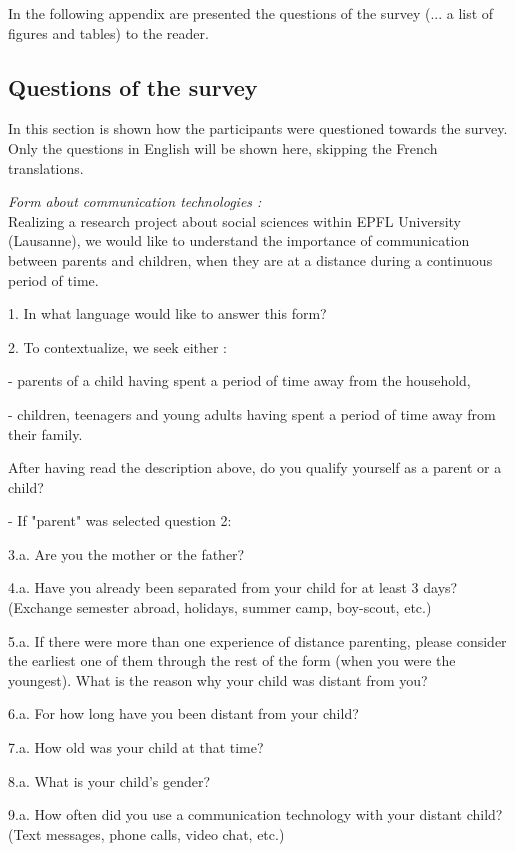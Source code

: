 \appendix

In the following appendix are presented the questions of the survey (... a list of figures and tables) to the reader.

\subsection{Questions of the survey}
\label{appendix:survey_questions}
In this section is shown how the participants were questioned towards the survey. Only the questions in English will be shown here, skipping the French translations.

\medskip \textit{Form about communication technologies :} \\
Realizing a research project about social sciences within EPFL University (Lausanne), we would like to understand the importance of communication between parents and children, when they are at a distance during a continuous period of time.

\vspace{4pt}
1. In what language would like to answer this form?

2. To contextualize, we seek either :

- parents of a child having spent a period of time away from the household,

- children, teenagers and young adults having spent a period of time away from their family.

After having read the description above, do you qualify yourself as a parent or a child?

\vspace{4pt}
\noindent - If "parent" was selected question 2: 

3.a. Are you the mother or the father?

4.a. Have you already been separated from your child for at least 3 days? (Exchange semester abroad, holidays, summer camp, boy-scout, etc.)

5.a. If there were more than one experience of distance parenting, please consider the earliest one of them through the rest of the form (when you were the youngest). What is the reason why your child was distant from you? 

6.a. For how long have you been distant from your child?

7.a. How old was your child at that time?

8.a. What is your child's gender?

9.a. How often did you use a communication technology with your distant child? (Text messages, phone calls, video chat, etc.)

